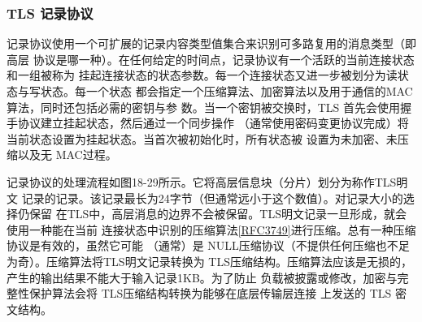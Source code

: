 \subsubsection{TLS 记录协议}
记录协议使用一个可扩展的记录内容类型值集合来识别可多路复用的消息类型（即高层
协议是哪一种）。在任何给定的时间点，记录协议有一个活跃的当前连接状态和一组被称为
挂起连接状态的状态参数。每一个连接状态又进一步被划分为读状态与写状态。每一个状态
都会指定一个压缩算法、加密算法以及用于通信的MAC算法，同时还包括必需的密钥与参
数。当一个密钥被交换时，TLS 首先会使用握手协议建立挂起状态，然后通过一个同步操作
（通常使用密码变更协议完成）将当前状态设置为挂起状态。当首次被初始化时，所有状态被
设置为未加密、未压缩以及无 MAC过程。

记录协议的处理流程如图18-29所示。它将高层信息块（分片）划分为称作TLS明文
记录的记录。该记录最长为24字节（但通常远小于这个数值）。对记录大小的选择仍保留
在TLS中，高层消息的边界不会被保留。TLS明文记录一旦形成，就会使用一种能在当前
连接状态中识别的压缩算法\href{https://www.rfc-editor.org/rfc/rfc3749}{[RFC3749]}进行压缩。总有一种压缩协议是有效的，虽然它可能
（通常）是 NULL压缩协议（不提供任何压缩也不足为奇）。压缩算法将TLS明文记录转换为
TLS压缩结构。压缩算法应该是无损的，产生的输出结果不能大于输入记录1KB。为了防止
负载被披露或修改，加密与完整性保护算法会将 TLS压缩结构转换为能够在底层传输层连接
上发送的 TLS 密文结构。

